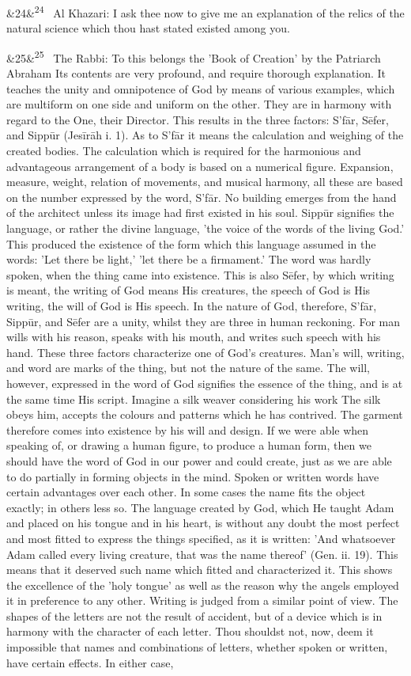 \documentclass[12pt]{article}
\newcommand{\para}[1][]{\par\noindent\ifx&#1&\else\textsuperscript{\footnotesize #1}~\fi}
\begin{document}
\para[24] Al Khazari: I ask thee now to give me an explanation of the relics of the natural science which thou hast stated existed among you.

\para[25] The Rabbi: To this belongs the 'Book of Creation' by the Patriarch Abraham Its contents are very profound, and require thorough explanation. It teaches the unity and omnipotence of God by means of various examples, which are multiform on one side and uniform on the other. They are in harmony with regard to the One, their Director. This results in the three factors: S’fār, Sēfer, and Sippūr (Jesīrāh i. 1). As to S’fār it means the calculation and weighing of the created bodies. The calculation which is required for the harmonious and advantageous arrangement of a body is based on a numerical figure. Expansion, measure, weight, relation of movements, and musical harmony, all these are based on the number expressed by the word, S’fār. No building emerges from the hand of the architect unless its image had first existed in his soul. Sippūr signifies the language, or rather the divine language, 'the voice of the words of the living God.' This produced the existence of the form which this language assumed in the words: 'Let there be light,' 'let there be a firmament.' The word was hardly spoken, when the thing came into existence. This is also Sēfer, by which writing is meant, the writing of God means His creatures, the speech of God is His writing, the will of God is His speech. In the nature of God, therefore, S’fār, Sippūr, and Sēfer are a unity, whilst they are three in human reckoning. For man wills with his reason, speaks with his mouth, and writes such speech with his hand. These three factors characterize one of God's creatures. Man's will, writing, and word are marks of the thing, but not the nature of the same. The will, however, expressed in the word of God signifies the essence of the thing, and is at the same time His script. Imagine a silk weaver considering his work The silk obeys him, accepts the colours and patterns which he has contrived. The garment therefore comes into existence by his will and design. If we were able when speaking of, or drawing a human figure, to produce a human form, then we should have the word of God in our power and could create, just as we are able to do partially in forming objects in the mind. Spoken or written words have certain advantages over each other. In some cases the name fits the object exactly; in others less so. The language created by God, which He taught Adam and placed on his tongue and in his heart, is without any doubt the most perfect and most fitted to express the things specified, as it is written: 'And whatsoever Adam called every living creature, that was the name thereof' (Gen. ii. 19). This means that it deserved such name which fitted and characterized it. This shows the excellence of the 'holy tongue' as well as the reason why the angels employed it in preference to any other. Writing is judged from a similar point of view. The shapes of the letters are not the result of accident, but of a device which is in harmony with the character of each letter. Thou shouldst not, now, deem it impossible that names and combinations of letters, whether spoken or written, have certain effects. In either case, 
\end{document}
